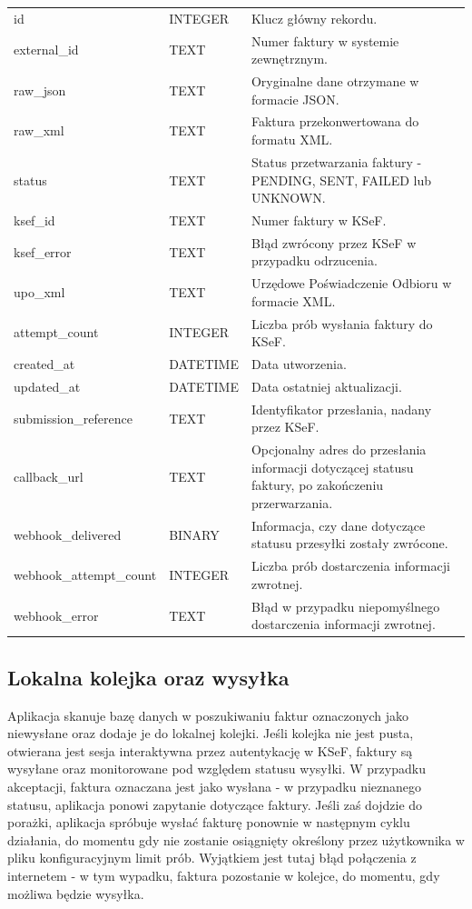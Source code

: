 \begin{small}
\begin{longtable}{>{\raggedright\arraybackslash}p{4cm} >{\raggedright\arraybackslash}p{2cm} >{\raggedright\arraybackslash}p{7cm}}
id & INTEGER & Klucz główny rekordu. \\
external\_id & TEXT & Numer faktury w systemie zewnętrznym. \\
raw\_json & TEXT & Oryginalne dane otrzymane w formacie JSON. \\
raw\_xml & TEXT & Faktura przekonwertowana do formatu XML. \\
status & TEXT & Status przetwarzania faktury - PENDING, SENT, FAILED lub UNKNOWN. \\
ksef\_id & TEXT & Numer faktury w KSeF. \\
ksef\_error & TEXT & Błąd zwrócony przez KSeF w przypadku odrzucenia. \\
upo\_xml & TEXT & Urzędowe Poświadczenie Odbioru w formacie XML. \\
attempt\_count & INTEGER & Liczba prób wysłania faktury do KSeF. \\
created\_at & DATETIME & Data utworzenia. \\
updated\_at & DATETIME & Data ostatniej aktualizacji. \\
submission\_reference & TEXT & Identyfikator przesłania, nadany przez KSeF. \\
callback\_url & TEXT & Opcjonalny adres do przesłania informacji dotyczącej statusu faktury, po zakończeniu przerwarzania. \\
webhook\_delivered & BINARY & Informacja, czy dane dotyczące statusu przesyłki zostały zwrócone. \\
webhook\_attempt\_count & INTEGER & Liczba prób dostarczenia informacji zwrotnej. \\
webhook\_error & TEXT & Błąd w przypadku niepomyślnego dostarczenia informacji zwrotnej. \\
\end{longtable}
\end{small}

\subsection{Lokalna kolejka oraz wysyłka}
Aplikacja skanuje bazę danych w poszukiwaniu faktur oznaczonych jako niewysłane oraz dodaje je do lokalnej kolejki. Jeśli kolejka nie jest pusta, otwierana jest sesja interaktywna przez autentykację w KSeF, faktury są wysyłane oraz monitorowane pod względem statusu wysyłki. W przypadku akceptacji, faktura oznaczana jest jako wysłana - w przypadku nieznanego statusu, aplikacja ponowi zapytanie dotyczące faktury. Jeśli zaś dojdzie do porażki, aplikacja spróbuje wysłać fakturę ponownie w następnym cyklu działania, do momentu gdy nie zostanie osiągnięty określony przez użytkownika w pliku konfiguracyjnym limit prób. Wyjątkiem jest tutaj błąd połączenia z internetem - w tym wypadku, faktura pozostanie w kolejce, do momentu, gdy możliwa będzie wysyłka.

